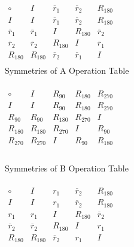 \documentclass[11pt,a4paper]{article}
\begin{document}
\begin{center}
$
\begin{array}{c|c|c|c|c}
\circ & I & \overline{r}_1 & \overline{r}_2 & R_{180}\\\hline
I & I & \overline{r}_1 & \overline{r}_2 & R_{180}\\\hline
\overline{r}_1 & \overline{r}_1 & I & R_{180} & \overline{r}_2\\\hline
\overline{r}_2 & \overline{r}_2 & R_{180} & I & \overline{r}_1\\\hline
R_{180} & R_{180} & \overline{r}_2 &\overline{r}_1&  I\\
\end{array}
$\\
Symmetries of A Operation Table\\
~\\
$
\begin{array}{c|c|c|c|c}
\circ & I & R_{90} & R_{180} & R_{270}\\\hline
I & I & R_{90} & R_{180} & R_{270}\\\hline
R_{90} & R_{90} & R_{180} & R_{270} & I\\\hline
R_{180} & R_{180} & R_{270} & I & R_{90}\\\hline
R_{270} & R_{270} & I & R_{90} & R_{180}\\
\end{array}
$\\
~\\
Symmetries of B Operation Table\\
~\\
$
\begin{array}{c|c|c|c|c}
\circ & I & r_1 & \overline{r}_2 & R_{180}\\\hline
I & I & r_1 & \overline{r}_2 & R_{180}\\\hline
r_1 & r_1 & I & R_{180} & \overline{r}_2\\\hline
\overline{r}_2 & \overline{r}_2 & R_{180} & I & r_1\\\hline
R_{180} & R_{180} & \overline{r}_2 & r_1 & I\\
\end{array}
$\\
\end{center}
\end{document}

